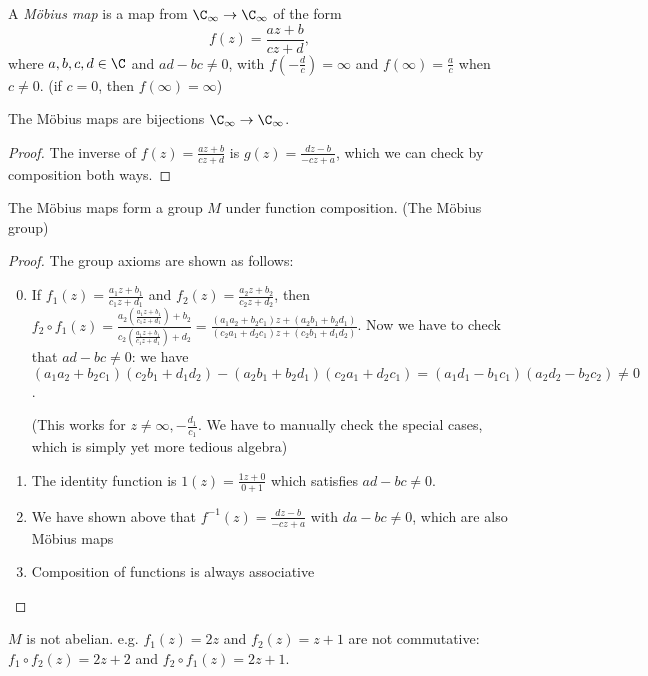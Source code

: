 \documentclass[a4paper]{article}
\begin{document}
  \begin{defi}
    A \emph{M\"obius map} is a map from $\C_\infty \to \C_\infty$ of the form
    \[
      f(z) = \frac{az + b}{cz + d},
    \]
    where $a, b, c, d\in \C$ and $ad - bc\not= 0$, with $f(-\frac{d}{c}) = \infty$ and $f(\infty) = \frac{a}{c}$ when $c\not= 0$. (if $c = 0$, then $f(\infty)=\infty$)
  \end{defi}

  \begin{lemma}
    The M\"obius maps are bijections $\C_\infty \to \C_\infty$. 
  \end{lemma}

  \begin{proof}
    The inverse of $f(z) = \frac{az + b}{cz+ d}$ is $g(z) = \frac{dz - b}{-cz + a}$, which we can check by composition both ways.
  \end{proof}

  \begin{prop}
    The M\"obius maps form a group $M$ under function composition. (The M\"obius group)
  \end{prop}
  \begin{proof}
    The group axioms are shown as follows:
    \begin{enumerate}[label=\arabic{*}.]
        \setcounter{enumi}{-1}
      \item If $f_1(z) = \frac{a_1z + b_1}{c_1z + d_1}$ and $f_2(z) = \frac{a_2z + b_2}{c_2 z + d_2}$, then $\displaystyle f_2\circ f_1 (z) = \frac{a_2\left(\frac{a_1z + b_1}{c_1z + d_1}\right) + b_2}{c_2\left(\frac{a_1z + b_1}{c_1z + d_1}\right) + d_2} = \frac{(a_1a_2 + b_2c_1)z + (a_2b_1 + b_2d_1)}{(c_2a_1 + d_2c_1)z + (c_2b_1 + d_1d_2)}$. Now we have to check that $ad - bc \not = 0$: we have $(a_1a_2 + b_2c_1)(c_2b_1 + d_1d_2) - (a_2b_1 + b_2d_1)(c_2a_1 + d_2c_1) = (a_1d_1 - b_1c_1)(a_2d_2 - b_2c_2)\not =0 $.

        (This works for $z\not= \infty, -\frac{d_1}{c_1}$. We have to manually check the special cases, which is simply yet more tedious algebra)
      \item The identity function is $1(z) = \frac{1z + 0}{0 + 1}$ which satisfies $ad - bc \not= 0$.
      \item We have shown above that $f^{-1}(z) = \frac{dz - b}{-cz + a}$ with $da - bc\not= 0$, which are also M\"obius maps
      \item Composition of functions is always associative
    \end{enumerate}
  \end{proof}
  \note $M$ is not abelian. e.g. $f_1(z) = 2z$ and $f_2(z) = z + 1$ are not commutative: $f_1\circ f_2(z) = 2z+2$ and $f_2\circ f_1(z) = 2z + 1$.
\end{document}
